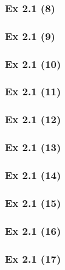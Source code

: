 \subsubsection{Ex 2.1 (8)}\label{sec:Ex_2.1.8}

\subsubsection{Ex 2.1 (9)}\label{sec:Ex_2.1.9}

\subsubsection{Ex 2.1 (10)}\label{sec:Ex_2.1.10}

\newpage		%

\subsubsection{Ex 2.1 (11)}\label{sec:Ex_2.1.11}

\subsubsection{Ex 2.1 (12)}\label{sec:Ex_2.1.12}

\subsubsection{Ex 2.1 (13)}\label{sec:Ex_2.1.13}

\subsubsection{Ex 2.1 (14)}\label{sec:Ex_2.1.14}

\subsubsection{Ex 2.1 (15)}\label{sec:Ex_2.1.15}

\subsubsection{Ex 2.1 (16)}\label{sec:Ex_2.1.16}

\subsubsection{Ex 2.1 (17)}\label{sec:Ex_2.1.17}


